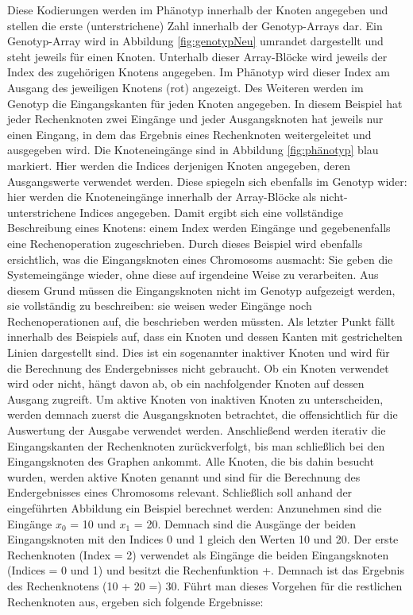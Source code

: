 Diese Kodierungen werden im Phänotyp innerhalb der Knoten angegeben und stellen die erste (unterstrichene) Zahl innerhalb der Genotyp-Arrays dar.
Ein Genotyp-Array wird in Abbildung \ref{fig:genotypNeu} umrandet dargestellt und steht jeweils für einen Knoten.
Unterhalb dieser Array-Blöcke wird jeweils der Index des zugehörigen Knotens angegeben.
Im Phänotyp wird dieser Index am Ausgang des jeweiligen Knotens (rot) angezeigt.\newline
Des Weiteren werden im Genotyp die Eingangskanten für jeden Knoten angegeben. 
In diesem Beispiel hat jeder Rechenknoten zwei Eingänge und jeder Ausgangsknoten hat jeweils nur einen Eingang, in dem das Ergebnis eines Rechenknoten weitergeleitet und ausgegeben wird.
Die Knoteneingänge sind in Abbildung \ref{fig:phänotyp} blau markiert.
Hier werden die Indices derjenigen Knoten angegeben, deren Ausgangswerte verwendet werden.
Diese spiegeln sich ebenfalls im Genotyp wider: hier werden die Knoteneingänge innerhalb der Array-Blöcke als nicht-unterstrichene Indices angegeben.
Damit ergibt sich eine vollständige Beschreibung eines Knotens: einem Index werden Eingänge und gegebenenfalls eine Rechenoperation zugeschrieben.\newline
Durch dieses Beispiel wird ebenfalls ersichtlich, was die Eingangsknoten eines Chromosoms ausmacht:
Sie geben die Systemeingänge wieder, ohne diese auf irgendeine Weise zu verarbeiten.
Aus diesem Grund müssen die Eingangsknoten nicht im Genotyp aufgezeigt werden, sie vollständig zu beschreiben: sie weisen weder Eingänge noch Rechenoperationen auf, die beschrieben werden müssten.\newline
Als letzter Punkt fällt innerhalb des Beispiels auf, dass ein Knoten und dessen Kanten mit gestrichelten Linien dargestellt sind.
Dies ist ein sogenannter inaktiver Knoten und wird für die Berechnung des Endergebnisses nicht gebraucht.
Ob ein Knoten verwendet wird oder nicht, hängt davon ab, ob ein nachfolgender Knoten auf dessen Ausgang zugreift.
Um aktive Knoten von inaktiven Knoten zu unterscheiden, werden demnach zuerst die Ausgangsknoten betrachtet, die offensichtlich für die Auswertung der Ausgabe verwendet werden.
Anschließend werden iterativ die Eingangskanten der Rechenknoten zurückverfolgt, bis man schließlich bei den Eingangsknoten des Graphen ankommt.
Alle Knoten, die bis dahin besucht wurden, werden aktive Knoten genannt und sind für die Berechnung des Endergebnisses eines Chromosoms relevant. \newline
Schließlich soll anhand der eingeführten Abbildung ein Beispiel berechnet werden:\newline
Anzunehmen sind die Eingänge $x_0$ = 10 und $x_1$ = 20.
Demnach sind die Ausgänge der beiden Eingangsknoten mit den Indices 0 und 1 gleich den Werten 10 und 20.
Der erste Rechenknoten (Index = 2) verwendet als Eingänge die beiden Eingangsknoten (Indices = 0 und 1) und besitzt die Rechenfunktion +.
Demnach ist das Ergebnis des Rechenknotens (10 + 20 =) 30.
Führt man dieses Vorgehen für die restlichen Rechenknoten aus, ergeben sich folgende Ergebnisse:

